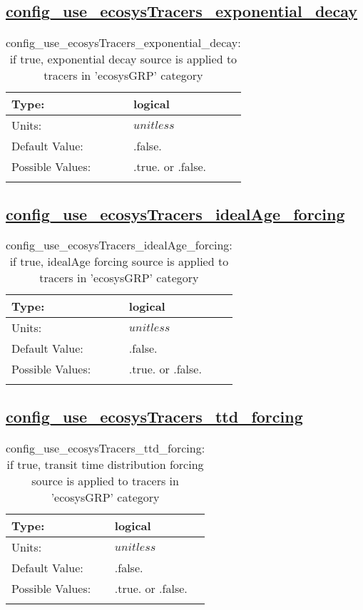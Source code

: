 \subsection[config\_use\_ecosysTracers\_exponential\_decay]{\hyperref[sec:nm_tab_tracer_forcing_ecosysTracers]{config\_use\_ecosysTracers\_exponential\_decay}}
\label{subsec:nm_sec_config_use_ecosysTracers_exponential_decay}
\begin{center}
\begin{longtable}{| p{2.0in} || p{4.0in} |}
    \hline
    Type: & logical \\
    \hline
    Units: & $unitless$ \\
    \hline
    Default Value: & .false. \\
    \hline
    Possible Values: & .true. or .false. \\
    \hline
    \caption{config\_use\_ecosysTracers\_exponential\_decay: if true, exponential decay source is applied to tracers in 'ecosysGRP' category}
\end{longtable}
\end{center}
\subsection[config\_use\_ecosysTracers\_idealAge\_forcing]{\hyperref[sec:nm_tab_tracer_forcing_ecosysTracers]{config\_use\_ecosysTracers\_idealAge\_forcing}}
\label{subsec:nm_sec_config_use_ecosysTracers_idealAge_forcing}
\begin{center}
\begin{longtable}{| p{2.0in} || p{4.0in} |}
    \hline
    Type: & logical \\
    \hline
    Units: & $unitless$ \\
    \hline
    Default Value: & .false. \\
    \hline
    Possible Values: & .true. or .false. \\
    \hline
    \caption{config\_use\_ecosysTracers\_idealAge\_forcing: if true, idealAge forcing source is applied to tracers in 'ecosysGRP' category}
\end{longtable}
\end{center}
\subsection[config\_use\_ecosysTracers\_ttd\_forcing]{\hyperref[sec:nm_tab_tracer_forcing_ecosysTracers]{config\_use\_ecosysTracers\_ttd\_forcing}}
\label{subsec:nm_sec_config_use_ecosysTracers_ttd_forcing}
\begin{center}
\begin{longtable}{| p{2.0in} || p{4.0in} |}
    \hline
    Type: & logical \\
    \hline
    Units: & $unitless$ \\
    \hline
    Default Value: & .false. \\
    \hline
    Possible Values: & .true. or .false. \\
    \hline
    \caption{config\_use\_ecosysTracers\_ttd\_forcing: if true, transit time distribution forcing source is applied to tracers in 'ecosysGRP' category}
\end{longtable}
\end{center}
